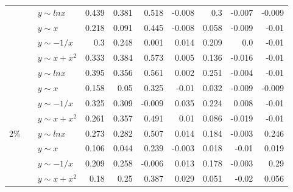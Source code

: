 \begin{table*}[!ht]
\begin{tabular}{| l | l | l | r | r | r | r | r | r | r | }
&\multirow{4}{*}{\metrictwok{}}
&$y\sim lnx$&\cellcolor[rgb]{.7,.7,.7}0.439&\cellcolor[rgb]{.7,.7,.7}0.381&\cellcolor[rgb]{.5,.5,.5}0.518&-0.008&\cellcolor[rgb]{.7,.7,.7}0.3&-0.007&-0.009  \\ \cline{3-10}
&&$y\sim x$&\cellcolor[rgb]{.9,.9,.9}0.218&\cellcolor[rgb]{.9,.9,.9}0.091&\cellcolor[rgb]{.7,.7,.7}0.445&-0.008&\cellcolor[rgb]{.9,.9,.9}0.058&-0.009&-0.01  \\ \cline{3-10}
&&$y\sim -1/x$&\cellcolor[rgb]{.7,.7,.7}0.3&\cellcolor[rgb]{.9,.9,.9}0.248&\cellcolor[rgb]{.9,.9,.9}0.001&\cellcolor[rgb]{.9,.9,.9}0.014&\cellcolor[rgb]{.9,.9,.9}0.209&0.0&-0.01  \\ \cline{3-10}
&&$y\sim x+x^2$&\cellcolor[rgb]{.7,.7,.7}0.333&\cellcolor[rgb]{.7,.7,.7}0.384&\cellcolor[rgb]{.5,.5,.5}0.573&\cellcolor[rgb]{.9,.9,.9}0.005&\cellcolor[rgb]{.9,.9,.9}0.136&-0.016&-0.01  \\ \cline{2-10}

&\multirow{4}{*}{\metrictwop{}}
&$y\sim lnx$&\cellcolor[rgb]{.7,.7,.7}0.395&\cellcolor[rgb]{.7,.7,.7}0.356&\cellcolor[rgb]{.5,.5,.5}0.561&\cellcolor[rgb]{.9,.9,.9}0.002&\cellcolor[rgb]{.7,.7,.7}0.251&-0.004&-0.01  \\ \cline{3-10}
&&$y\sim x$&\cellcolor[rgb]{.9,.9,.9}0.158&\cellcolor[rgb]{.9,.9,.9}0.05&\cellcolor[rgb]{.7,.7,.7}0.325&-0.01&\cellcolor[rgb]{.9,.9,.9}0.032&-0.009&-0.009  \\ \cline{3-10}
&&$y\sim -1/x$&\cellcolor[rgb]{.7,.7,.7}0.325&\cellcolor[rgb]{.7,.7,.7}0.309&-0.009&\cellcolor[rgb]{.9,.9,.9}0.035&\cellcolor[rgb]{.9,.9,.9}0.224&\cellcolor[rgb]{.9,.9,.9}0.008&-0.01  \\ \cline{3-10}
&&$y\sim x+x^2$&\cellcolor[rgb]{.7,.7,.7}0.261&\cellcolor[rgb]{.7,.7,.7}0.357&\cellcolor[rgb]{.7,.7,.7}0.491&\cellcolor[rgb]{.9,.9,.9}0.01&\cellcolor[rgb]{.9,.9,.9}0.086&-0.019&-0.01  \\ \hline

\multirow{16}{*}{2\%}

&\multirow{4}{*}{\metricone{}}
&$y\sim lnx$&\cellcolor[rgb]{.7,.7,.7}0.273&\cellcolor[rgb]{.7,.7,.7}0.282&\cellcolor[rgb]{.5,.5,.5}0.507&\cellcolor[rgb]{.9,.9,.9}0.014&\cellcolor[rgb]{.9,.9,.9}0.184&-0.003&\cellcolor[rgb]{.9,.9,.9}0.246  \\ \cline{3-10}
&&$y\sim x$&\cellcolor[rgb]{.9,.9,.9}0.106&\cellcolor[rgb]{.9,.9,.9}0.044&\cellcolor[rgb]{.9,.9,.9}0.239&-0.003&\cellcolor[rgb]{.9,.9,.9}0.018&-0.01&\cellcolor[rgb]{.9,.9,.9}0.019  \\ \cline{3-10}
&&$y\sim -1/x$&\cellcolor[rgb]{.9,.9,.9}0.209&\cellcolor[rgb]{.7,.7,.7}0.258&-0.006&\cellcolor[rgb]{.9,.9,.9}0.013&\cellcolor[rgb]{.9,.9,.9}0.178&-0.003&\cellcolor[rgb]{.7,.7,.7}0.29  \\ \cline{3-10}
&&$y\sim x+x^2$&\cellcolor[rgb]{.9,.9,.9}0.18&\cellcolor[rgb]{.7,.7,.7}0.25&\cellcolor[rgb]{.7,.7,.7}0.387&\cellcolor[rgb]{.9,.9,.9}0.029&\cellcolor[rgb]{.9,.9,.9}0.051&-0.02&\cellcolor[rgb]{.9,.9,.9}0.056  \\ \cline{2-10}


\end{tabular}
\end{table*}
